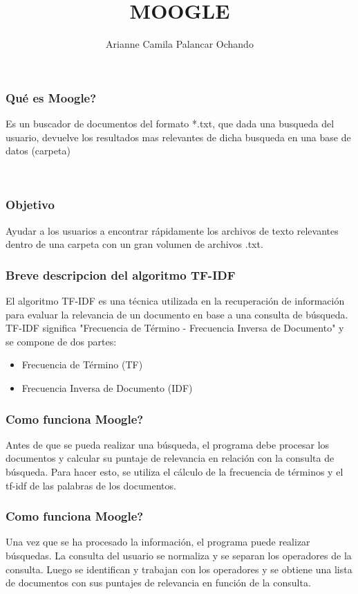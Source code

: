 \documentclass{beamer}
\title{MOOGLE}
\author{Arianne Camila Palancar Ochando}
\begin{document}
\begin{frame}
  \titlepage
\end{frame}

\begin{frame}
  \frametitle{Qué es Moogle?}
  Es un buscador de documentos del formato *.txt, que dada una busqueda del
usuario, devuelve los resultados mas relevantes de dicha busqueda en una base
de datos (carpeta)
\end{frame}

\begin{frame}
      \frametitle{Objetivo}
    Ayudar a los usuarios a encontrar rápidamente los archivos de texto relevantes dentro de una carpeta con un gran volumen de archivos .txt.
\end{frame}

\begin{frame}
    \frametitle{Breve descripcion del algoritmo TF-IDF}
    El algoritmo TF-IDF es una técnica utilizada en la recuperación de información para evaluar la relevancia de un documento en base a una consulta de búsqueda. TF-IDF significa "Frecuencia de Término - Frecuencia Inversa de Documento" y se compone de dos partes:

    \begin{itemize}
        \item Frecuencia de Término (TF)
        \item Frecuencia Inversa de Documento (IDF)
    \end{itemize}
\end{frame}

    
\begin{frame}
    \frametitle{Como funciona Moogle?}
    Antes de que se pueda realizar una búsqueda, el programa debe procesar los documentos y calcular su puntaje de relevancia en relación con la consulta de búsqueda. Para hacer esto, se utiliza el cálculo de la frecuencia de términos y el tf-idf de las palabras de los documentos.
\end{frame}

\begin{frame}
    \frametitle{Como funciona Moogle?}
    Una vez que se ha procesado la información, el programa puede realizar búsquedas. La consulta del usuario se normaliza y se separan los operadores de la consulta. Luego se identifican y trabajan con los operadores y se obtiene una lista de documentos con sus puntajes de relevancia en función de la consulta.
\end{frame}
    
\end{document}
